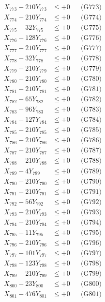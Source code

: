 \documentclass[a4paper,10pt]{article}
\begin{document}
{\begin{align}
X_{773} - 210Y_{773} &\leq +0 && \text{(G773)} \\
X_{774} - 210Y_{774} &\leq +0 && \text{(G774)} \\
X_{775} - 32Y_{775} &\leq +0 && \text{(G775)} \\
X_{776} - 128Y_{776} &\leq +0 && \text{(G776)} \\
X_{777} - 210Y_{777} &\leq +0 && \text{(G777)} \\
X_{778} - 32Y_{778} &\leq +0 && \text{(G778)} \\
X_{779} - 210Y_{779} &\leq +0 && \text{(G779)} \\
X_{780} - 210Y_{780} &\leq +0 && \text{(G780)} \\
\allowbreak
X_{781} - 210Y_{781} &\leq +0 && \text{(G781)} \\
X_{782} - 65Y_{782} &\leq +0 && \text{(G782)} \\
X_{783} - 96Y_{783} &\leq +0 && \text{(G783)} \\
X_{784} - 127Y_{784} &\leq +0 && \text{(G784)} \\
X_{785} - 210Y_{785} &\leq +0 && \text{(G785)} \\
X_{786} - 210Y_{786} &\leq +0 && \text{(G786)} \\
X_{787} - 210Y_{787} &\leq +0 && \text{(G787)} \\
X_{788} - 210Y_{788} &\leq +0 && \text{(G788)} \\
X_{789} - 4Y_{789} &\leq +0 && \text{(G789)} \\
X_{790} - 210Y_{790} &\leq +0 && \text{(G790)} \\
\allowbreak
X_{791} - 210Y_{791} &\leq +0 && \text{(G791)} \\
X_{792} - 56Y_{792} &\leq +0 && \text{(G792)} \\
X_{793} - 210Y_{793} &\leq +0 && \text{(G793)} \\
X_{794} - 210Y_{794} &\leq +0 && \text{(G794)} \\
X_{795} - 11Y_{795} &\leq +0 && \text{(G795)} \\
X_{796} - 210Y_{796} &\leq +0 && \text{(G796)} \\
X_{797} - 101Y_{797} &\leq +0 && \text{(G797)} \\
X_{798} - 123Y_{798} &\leq +0 && \text{(G798)} \\
X_{799} - 210Y_{799} &\leq +0 && \text{(G799)} \\
X_{800} - 23Y_{800} &\leq +0 && \text{(G800)} \\
\allowbreak
X_{801} - 476Y_{801} &\leq +0 && \text{(G801)} \\

\end{align}}
\end{document}
